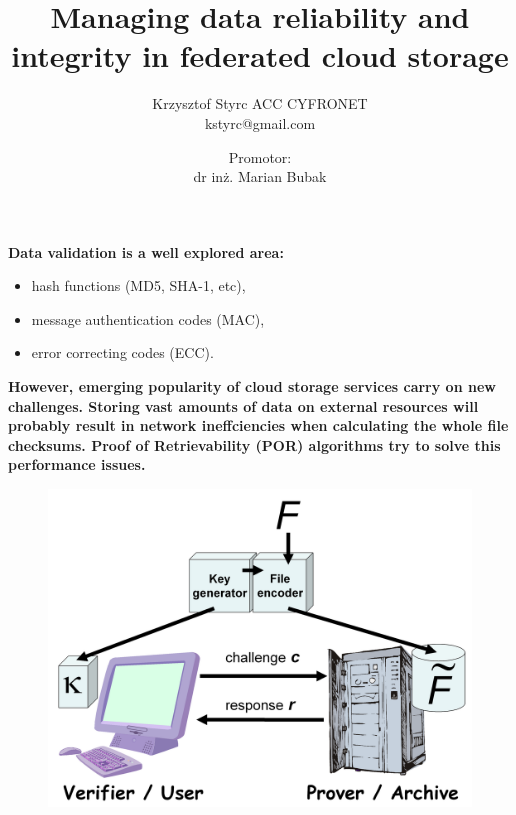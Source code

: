 \documentclass{beamer}
\title[Data reliability and integrity]{Managing data reliability and integrity in federated cloud storage}
\author[Krzysztof Styrc ACC CYFRONET]{
Krzysztof Styrc ACC CYFRONET\\
\noindent
kstyrc@gmail.com
}
\date[]{
Promotor:\\
\noindent
dr inż. Marian Bubak
}
\begin{document}
\frame{\titlepage}

\begin{frame}
\begin{block}{\textbf{Data validation is a well explored area:}}
\begin{itemize}
	\item hash functions (MD5, SHA-1, etc),
	\item message authentication codes (MAC),
	\item error correcting codes (ECC).
\end{itemize}
\end{block}
\begin{exampleblock}{\textbf{However, emerging popularity of cloud storage services carry on new challenges. Storing vast amounts of data on external resources will probably result in network ineffciencies when calculating the whole file checksums. Proof of Retrievability (POR) algorithms try to solve this performance issues.}}
\begin{figure}
\centering
\includegraphics[scale=0.04]{por.png}
\end{figure}
\end{exampleblock}
\end{frame}
\end{document}

